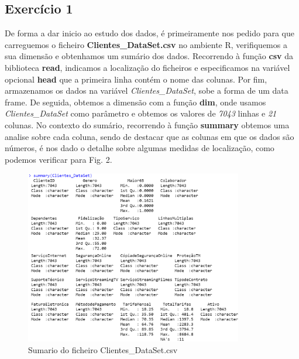 \subsection{Exercício 1}
De forma a dar inicio ao estudo dos dados, é primeiramente nos pedido para que carreguemos o ficheiro \textbf{Clientes\_DataSet.csv} no ambiente R, verifiquemos a sua dimensão e obtenhamos um sumário dos dados. Recorrendo à função \textbf{csv} da biblioteca \textbf{read}, indicamos a localização do ficheiros e especificamos na variável opcional \textbf{head} que a primeira linha contém o nome das colunas. Por fim, armazenamos os dados na variável \textit{Clientes\_DataSet}, sobe a forma de um data frame. De seguida, obtemos a dimensão com a função \textbf{dim}, onde usamos \textit{Clientes\_DataSet} como parâmetro e obtemos os valores de \textit{7043} linhas e \textit{21} colunas. No contexto do sumário, recorrendo à função \textbf{summary} obtemos uma analise sobre cada coluna, sendo de destacar que as colunas em que os dados são números, é nos dado o detalhe sobre algumas medidas de localização, como podemos verificar para Fig. 2.

\begin{figure}[htbp]
\centerline{\includegraphics[width=9.5cm]{images/ex_1_summary2.png}}
\caption{Sumario do ficheiro Clientes\_DataSet.csv}
\label{ex_1_summary2}
\end{figure}

